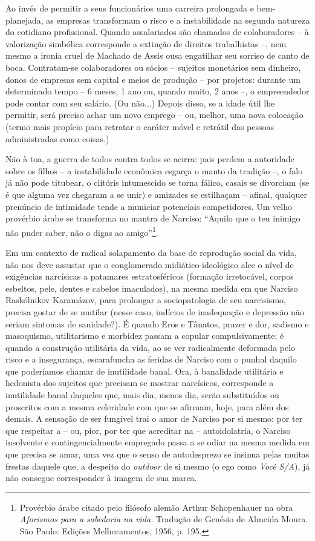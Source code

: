 Ao invés de permitir a seus funcionários uma carreira prolongada e
bem-planejada, as empresas transformam o risco e a instabilidade na
segunda natureza do cotidiano profissional. Quando assalariados são
chamados de colaboradores -- à valorização simbólica corresponde a
extinção de direitos trabalhistas --, nem mesmo a ironia cruel de
Machado de Assis ousa engatilhar seu sorriso de canto de boca.
Contratam-se colaboradores ou sócios -- sujeitos monetários sem
dinheiro, donos de empresas sem capital e meios de produção -- por
projetos: durante um determinado tempo -- 6 meses, 1 ano ou, quando
muito, 2 anos --, o empreendedor pode contar com seu salário. (Ou
não...) Depois disso, se a idade útil lhe permitir, será preciso achar
um novo emprego -- ou, melhor, uma nova colocação (termo mais propício
para retratar o caráter móvel e retrátil das pessoas administradas como
coisas.)

Não à toa, a guerra de todos contra todos se acirra: pais perdem a
autoridade sobre os filhos -- a instabilidade econômica esgarça o manto
da tradição --, o falo já não pode titubear, o clitóris intumescido se
torna fálico, casais se divorciam (se é que alguma vez chegaram a se
unir) e amizades se estilhaçam -- afinal, qualquer prenúncio de
intimidade tende a municiar potenciais competidores. Um velho provérbio
árabe se transforma no mantra de Narciso: ``Aquilo que o teu inimigo não
puder saber, não o digas ao amigo''\footnote{Provérbio árabe citado pelo
  filósofo alemão Arthur Schopenhauer na obra \emph{Aforismos para a
  sabedoria na vida.} Tradução de Genésio de Almeida Moura. São Paulo:
  Edições Melhoramentos, 1956, p. 195.}.

Em um contexto de radical solapamento da base de reprodução social da
vida, não nos deve assustar que o conglomerado midiático-ideológico alce
o nível de exigências narcísicas a patamares estratosféricos (formação
irretocável, corpos esbeltos, pele, dentes e cabelos imaculados), na
mesma medida em que Narciso Raskólnikov Karamázov, para prolongar a
sociopatologia de seu narcisismo, precisa gostar de se mutilar (nesse
caso, indícios de inadequação e depressão não seriam sintomas de
sanidade?). É quando Eros e Tânatos, prazer e dor, sadismo e masoquismo,
utilitarismo e morbidez passam a copular compulsivamente; é quando a
construção utilitária da vida, ao se ver radicalmente deformada pelo
risco e a insegurança, escarafuncha as feridas de Narciso com o punhal
daquilo que poderíamos chamar de inutilidade banal. Ora, à banalidade
utilitária e hedonista dos sujeitos que precisam se mostrar narcísicos,
corresponde a inutilidade banal daqueles que, mais dia, menos dia, serão
substituídos ou proscritos com a mesma celeridade com que se afirmam,
hoje, para além dos demais. A sensação de ser fungível trai o amor de
Narciso por si mesmo: por ter que respeitar a -- ou, pior, por ter que
acreditar na -- autoidolatria, o Narciso insolvente e contingencialmente
empregado passa a se odiar na mesma medida em que precisa se amar, uma
vez que o senso de autodesprezo se insinua pelas muitas frestas daquele
que, a despeito do \emph{outdoor} de si mesmo (o ego como \emph{Você
S/A}), já não consegue corresponder à imagem de sua marca.

